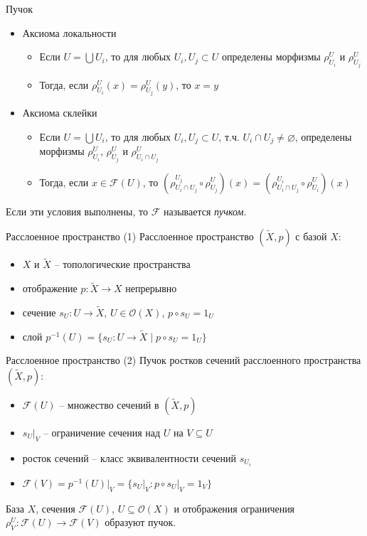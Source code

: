 \documentclass{beamer}
\begin{document}
\begin{frame}{Пучок}
\begin{itemize}
	\item Аксиома локальности
		\medskip
		\begin{itemize}
			\item Если $U = \bigcup U_i$, то для любых $U_i, U_j \subset U$ определены морфизмы $\rho^U_{U_i}$ и $\rho^U_{U_j}$
			\medskip
			\item Тогда, если $\rho^U_{U_i}(x) = \rho^U_{U_j}(y)$, то $x = y$
		\end{itemize}
	\bigskip
	\item Аксиома склейки
		\medskip
		\begin{itemize}
			\item Если $U = \bigcup U_i$, то для любых $U_i, U_j \subset U$, т.ч. $U_i \cap U_j \neq \varnothing$, определены морфизмы $\rho^U_{U_i}$, $\rho^U_{U_j}$ и $\rho^U_{U_i \cap U_j}$
			\medskip
			\item Тогда, если $x \in \mathcal{F}(U)$, то $(\rho^{U_j}_{U_i \cap U_j} \circ \rho^U_{U_j})(x) = (\rho^{U_i}_{U_i \cap U_j} \circ \rho^U_{U_i})(x)$
		\end{itemize}
\end{itemize}
\bigskip
Если эти условия выполнены, то $\mathcal{F}$ называется \textit{пучком}.
\end{frame}

\begin{frame}{Расслоенное пространство (1)}
Расслоенное пространство $(\widetilde{X}, p)$ с базой $X$:\\
\bigskip
\begin{itemize}
    \item $X$ и $\widetilde{X}$ -- топологические пространства
    \item отображение $p : \widetilde{X} \to X$ непрерывно
	\item сечение $s_U : U \to \widetilde{X}$, $U \in \mathcal{O}(X)$, $p \circ s_U = 1_U$
    \item слой $p^{-1}(U) = \{ s_U : U \to \widetilde{X} \; \vert \; p \circ s_U = 1_U \}$
\end{itemize}
\end{frame}

\begin{frame}{Расслоенное пространство (2)}
Пучок ростков сечений расслоенного пространства $(\widetilde{X}, p)$:\\
\bigskip
\begin{itemize}
    \item $\mathcal{F}(U)$ -- множество сечений в $(\widetilde{X}, p)$ 
    \item $s_U \vert_V$ -- ограничение сечения над $U$ на $V \subseteq U$
    \item росток сечений -- класс эквивалентности сечений $s_{U_i}$
    \item $\mathcal{F}(V) = p^{-1}(U) \vert_V = \{ s_U \vert_V : p \circ s_U \vert_V = 1_V \}$
\end{itemize}
\bigskip
База $X$, сечения $\mathcal{F}(U)$, $U \subseteq \mathcal{O}(X)$ и отображения ограничения $\rho^U_V : \mathcal{F}(U) \to \mathcal{F}(V)$ образуют пучок.
\end{frame}
\end{document}
